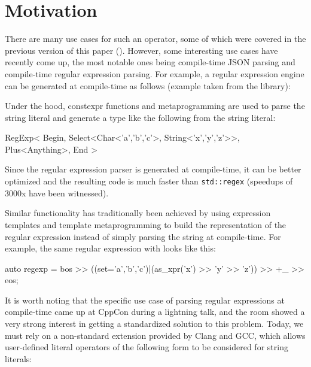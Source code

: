 \documentclass{wg21}
\newcommand{\cc}[1]{\texttt{#1}}
\begin{document}
\section{Motivation}
There are many use cases for such an operator, some of which were covered in
the previous version of this paper (\cite{P0424R0}). However, some interesting
use cases have recently come up, the most notable ones being compile-time
JSON parsing and compile-time regular expression parsing. For example, a
regular expression engine can be generated at compile-time as follows
(example taken from the \cite{CTRE} library):


Under the hood, constexpr functions and metaprogramming are used to parse the
string literal and generate a type like the following from the string literal:

\begin{cpp}
RegExp<
  Begin,
  Select<Char<'a','b','c'>, String<'x','y','z'>>,
  Plus<Anything>,
  End
>
\end{cpp}

Since the regular expression parser is generated at compile-time, it can be
better optimized and the resulting code is much faster than \cc{std::regex}
(speedups of 3000x have been witnessed).

Similar functionality has traditionally been achieved by using expression
templates and template metaprogramming to build the representation of the
regular expression instead of simply parsing the string at compile-time.
For example, the same regular expression with \cite{Boost.Xpressive} looks
like this:

\begin{cpp}
auto regexp = bos >> ((set='a','b','c')|(as_xpr('x') >> 'y' >> 'z')) >> +_ >> eos;
\end{cpp}

It is worth noting that the specific use case of parsing regular expressions
at compile-time came up at CppCon during a lightning talk, and the room showed
a very strong interest in getting a standardized solution to this problem.
Today, we must rely on a non-standard extension provided by Clang and GCC,
which allows user-defined literal operators of the following form to be
considered for string literals:
\end{document}
